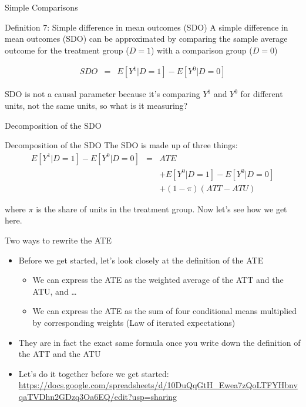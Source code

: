 \documentclass{beamer}
\begin{document}
\begin{frame}{Simple Comparisons}



  \begin{block}{Definition 7: Simple difference in mean outcomes (SDO)}
    A simple difference in mean outcomes (SDO) can be approximated by comparing the sample average outcome for the treatment group ($D=1$) with a comparison group ($D=0$)
    
    \begin{eqnarray*}
      SDO &=& E[Y^1 | D=1] - E[Y^0 | D=0]
    \end{eqnarray*}
  \end{block}
  \bigskip

SDO is not a causal parameter because it's comparing $Y^1$ and $Y^0$ for different units, not the same units, so what is it measuring? 

\end{frame}


\begin{frame}{Decomposition of the SDO}

  \begin{block}{Decomposition of the SDO}
    The SDO is made up of three things:
    \begin{eqnarray*}
      E[Y^1 | D=1] - E[Y^0 | D=0]&=& ATE\nonumber \\
      &&+ E[Y^0|D=1] - E[Y^0|D=0] \nonumber \\
      && + (1-\pi)(ATT - ATU)
    \end{eqnarray*}
  \end{block}

\bigskip

where $\pi$ is the share of units in the treatment group.  Now let's see how we get here.
\end{frame}

\begin{frame}{Two ways to rewrite the ATE}

\begin{itemize}
\item Before we get started, let's look closely at the definition of the ATE
	\begin{itemize}
	\item We can express the ATE as the weighted average of the ATT and the ATU, and \dots
	\item We can express the ATE as the sum of four conditional means multiplied by corresponding weights (Law of iterated expectations)
	\end{itemize}
\item They are in fact the exact same formula once you write down the definition of the ATT and the ATU
\item Let's do it together before we get started: \url{https://docs.google.com/spreadsheets/d/10DuQqGtH_Ewea7zQoLTFYHbnvqaTVDhn2GDzq3Oa6EQ/edit?usp=sharing}

\end{itemize}

\end{frame}
\end{document}
